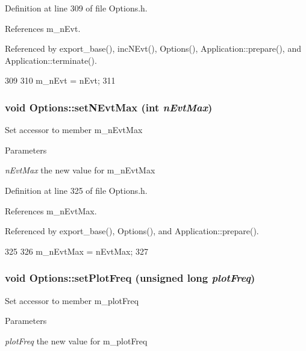 Definition at line 309 of file Options.h.

References m\_\-nEvt.

Referenced by export\_\-base(), incNEvt(), Options(), Application::prepare(), and Application::terminate().


\begin{DoxyCode}
309                                           {
310                 m_nEvt = nEvt;
311         }
\end{DoxyCode}
\hypertarget{classOptions_a6d732c0591188469287581bac8a4e3cd}{
\subsubsection[{setNEvtMax}]{\setlength{\rightskip}{0pt plus 5cm}void Options::setNEvtMax (int {\em nEvtMax})}}
\label{classOptions_a6d732c0591188469287581bac8a4e3cd}
Set accessor to member m\_\-nEvtMax 
\begin{DoxyParams}{Parameters}
\item[{\em nEvtMax}]the new value for m\_\-nEvtMax \end{DoxyParams}


Definition at line 325 of file Options.h.

References m\_\-nEvtMax.

Referenced by export\_\-base(), Options(), and Application::prepare().


\begin{DoxyCode}
325                                       {
326                 m_nEvtMax = nEvtMax;
327         }
\end{DoxyCode}
\hypertarget{classOptions_a7df298047f1506fa2244cf096da96409}{
\subsubsection[{setPlotFreq}]{\setlength{\rightskip}{0pt plus 5cm}void Options::setPlotFreq (unsigned long {\em plotFreq})}}
\label{classOptions_a7df298047f1506fa2244cf096da96409}
Set accessor to member m\_\-plotFreq 
\begin{DoxyParams}{Parameters}
\item[{\em plotFreq}]the new value for m\_\-plotFreq \end{DoxyParams}


